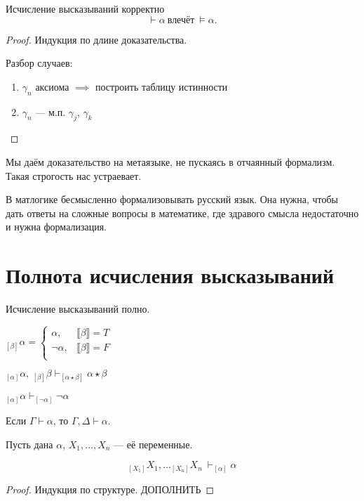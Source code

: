 \begin{theorem}
    Исчисление высказываний корректно
    \[ \vdash \alpha\ \text{влечёт}\ \vDash \alpha. \]
\end{theorem}
\begin{proof}
    Индукция по длине доказательства. 
    
    Разбор случаев:
    \begin{enumerate}
        \item $\gamma_n$ аксиома $\implies$ построить таблицу истинности
        \item $\gamma_n$ --- м.п. $\gamma_j$, $\gamma_k$
    \end{enumerate}
\end{proof}

Мы даём доказательство на метаязыке, не пускаясь в отчаянный формализм.
Такая строгость нас устраевает.

В матлогике бесмысленно формализовывать русский язык.
Она нужна, чтобы дать ответы на сложные вопросы в математике, где здравого смысла недостаточно и нужна формализация.

\section{Полнота исчисления высказываний}
\begin{theorem}
    Исчисление высказываний полно.
\end{theorem}

\begin{definition}
    $_{[\beta]}\alpha = 
    \begin{cases}
        \alpha, & \llbracket \beta \rrbracket = T\\
        \neg \alpha,&  \llbracket \beta \rrbracket = F\\
    \end{cases}$
\end{definition}

\begin{lemma}
    $_{[\alpha]}\alpha,\ _{[\beta]}\beta \vdash _{[\alpha \star \beta]} \alpha \star \beta$ 

    $_{[\alpha]} \alpha \vdash _{[\neg \alpha]}\neg\alpha $
\end{lemma}

\begin{lemma}
Если $\Gamma \vdash \alpha$, то $\Gamma, \Delta \vdash \alpha$.
\end{lemma}

\begin{lemma} 
Пусть дана $\alpha$, $X_1,\ldots, X_n$ --- её переменные.   

\[ _{[X_1]}X_1,\ldots _{[X_n]}X_n\ \vdash _{[\alpha]}\alpha  \]
\end{lemma}
\begin{proof}
    Индукция по структуре. ДОПОЛНИТЬ
\end{proof}

